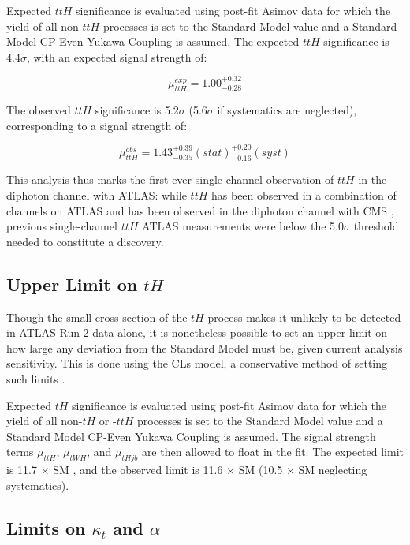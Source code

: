 Expected $ttH$ significance is evaluated using post-fit Asimov data for which the yield of all non-$ttH$ processes is set to the Standard Model value and a Standard Model CP-Even Yukawa Coupling is assumed. The expected $ttH$ significance is 4.4$\sigma$, with an expected signal strength of:
 
\begin{equation}
\mu_{ttH}^{exp} = 1.00^{+0.32}_{-0.28}
\end{equation}

The observed $ttH$ significance is 5.2$\sigma$ (5.6$\sigma$ if systematics are neglected), corresponding to a signal strength of:

\begin{equation}
\mu_{ttH}^{obs} = 1.43^{+0.39}_{-0.35}(stat)^{+0.20}_{-0.16}(syst)
\end{equation}
 

This analysis thus marks the first ever single-channel observation of $ttH$ in the diphoton channel with ATLAS: while $ttH$ has been observed in a combination of channels on ATLAS \cite{ttH} and has been observed in the diphoton channel with CMS \cite{ttHCMS}, previous single-channel $ttH$ ATLAS measurements were below the 5.0$\sigma$ threshold needed to constitute a discovery. 
 
\subsection{Upper Limit on $tH$}

Though the small cross-section of the $tH$ process makes it unlikely to be detected in ATLAS Run-2 data alone, it is nonetheless possible to set an upper limit on how large any deviation from the Standard Model must be, given current analysis sensitivity. This is done using the CLs model, a conservative method of setting such limits \cite{CLs}.

Expected $tH$ significance is evaluated using post-fit Asimov data for which the yield of all non-$tH$ or -$ttH$ processes is set to the Standard Model value and a Standard Model CP-Even Yukawa Coupling is assumed. The signal strength terms $\mu_{ttH}$, $\mu_{tWH}$, and $\mu_{tHjb}$ are then allowed to float in the fit. The expected limit is 11.7 $\times$ SM , and the observed limit is 11.6 $\times$ SM (10.5 $\times$ SM neglecting systematics).

\subsection{Limits on $\kappa_{t}$ and $\alpha$}

